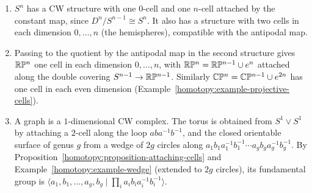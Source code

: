 \begin{example}\label{homotopy:example-cw}
\begin{enumerate}
\item $S^n$ has a CW structure with one $0$-cell and one $n$-cell attached by the constant map, since $D^n/S^{n-1} \cong S^n$. It also has a structure with two
cells in each dimension $0, \ldots, n$ (the hemispheres), compatible with the antipodal map.
\item Passing to the quotient by the antipodal map in the second structure gives $\mathbb{R}\mathbb{P}^n$ one cell in each dimension $0, \ldots, n$, with
$\mathbb{R}\mathbb{P}^n = \mathbb{R}\mathbb{P}^{n-1} \cup e^n$ attached along the double covering $S^{n-1} \to \mathbb{R}\mathbb{P}^{n-1}$. Similarly $\mathbb{C}\mathbb{P}^n = \mathbb{C}\mathbb{P}^{n-1} \cup e^{2n}$ has one cell in each
even dimension (Example~\ref{homotopy:example-projective-cells}).
\item A graph is a $1$-dimensional CW complex. The torus is obtained from $S^1 \vee S^1$ by attaching a $2$-cell along the loop $aba^{-1}b^{-1}$, and the closed
orientable surface of genus $g$ from a wedge of $2g$ circles along $a_1b_1a_1^{-1}b_1^{-1} \cdots a_gb_ga_g^{-1}b_g^{-1}$. By
Proposition~\ref{homotopy:proposition-attaching-cells} and Example~\ref{homotopy:example-wedge} (extended to $2g$ circles), its fundamental group is
$\langle a_1, b_1, \ldots, a_g, b_g \mid \prod_i a_ib_ia_i^{-1}b_i^{-1} \rangle$.
\end{enumerate}
\end{example}

